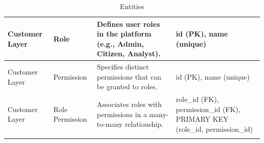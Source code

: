 \begin{longtable}{|p{3cm}|p{2cm}|p{6cm}|p{4cm}|}
Customer Layer & Role & Defines user roles in the platform (e.g., Admin, Citizen, Analyst). & id (PK), name (unique) \\ 
\hline

Customer Layer & Permission & Specifies distinct permissions that can be granted to roles. & id (PK), name (unique) \\
\hline

Customer Layer & Role Permission & Associates roles with permissions in a many-to-many relationship. & role\_id (FK), permission\_id (FK), PRIMARY KEY (role\_id, permission\_id) \\ 
\hline

\caption{Entities}
\end{longtable}